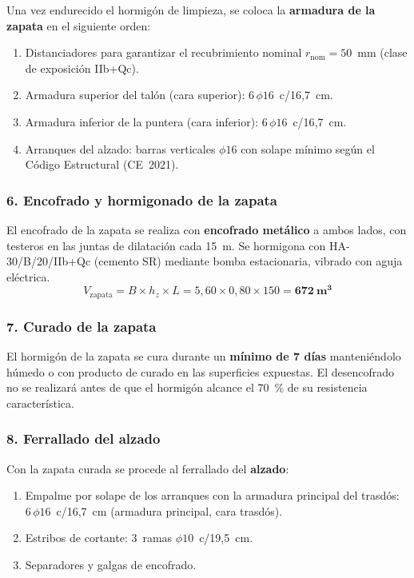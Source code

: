 Una vez endurecido el hormigón de limpieza, se coloca la
\textbf{armadura de la zapata} en el siguiente orden:
\begin{enumerate}
  \item Distanciadores para garantizar el recubrimiento nominal
        $r_{\mathrm{nom}} = 50$~mm (clase de exposición IIb+Qc).
  \item Armadura superior del talón (cara superior): $6\,\phi 16$~c/16{,}7~cm.
  \item Armadura inferior de la puntera (cara inferior): $6\,\phi 16$~c/16{,}7~cm.
  \item Arranques del alzado: barras verticales $\phi 16$ con solape mínimo
        según el Código Estructural (CE~2021).
\end{enumerate}

\subsubsection*{6. Encofrado y hormigonado de la zapata}

El encofrado de la zapata se realiza con \textbf{encofrado metálico} a ambos
lados, con testeros en las juntas de dilatación cada 15~m.
Se hormigona con HA-30/B/20/IIb+Qc (cemento SR) mediante bomba estacionaria,
vibrado con aguja eléctrica.
\[
  V_{\mathrm{zapata}} = B \times h_z \times L
  = 5{,}60 \times 0{,}80 \times 150 = \mathbf{672~\text{m}^3}
\]

\subsubsection*{7. Curado de la zapata}

El hormigón de la zapata se cura durante un \textbf{mínimo de 7 días}
manteniéndolo húmedo o con producto de curado en las superficies expuestas.
El desencofrado no se realizará antes de que el hormigón alcance el 70~\% de
su resistencia característica.

\subsubsection*{8. Ferrallado del alzado}

Con la zapata curada se procede al ferrallado del \textbf{alzado}:
\begin{enumerate}
  \item Empalme por solape de los arranques con la armadura principal del
        trasdós: $6\,\phi 16$~c/16{,}7~cm (armadura principal, cara trasdós).
  \item Estribos de cortante: 3~ramas $\phi 10$~c/19{,}5~cm.
  \item Separadores y galgas de encofrado.
\end{enumerate}

